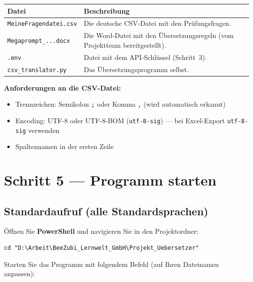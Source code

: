 \documentclass[a4paper,11pt]{article}
\newenvironment{hinweisbox}{%
  \begin{mdframed}[backgroundcolor=hinweis,linecolor=hinweisrand,linewidth=1pt,
    innerleftmargin=8pt,innerrightmargin=8pt,innertopmargin=6pt,innerbottommargin=6pt]
  \small}{%
  \end{mdframed}}
\begin{document}
\begin{center}
\begin{tabularx}{0.92\textwidth}{@{}l X@{}}
\toprule
\textbf{Datei} & \textbf{Beschreibung} \\
\midrule
\texttt{MeineFragendatei.csv} & Die deutsche CSV-Datei mit den Prüfungsfragen. \\[3pt]
\texttt{Megaprompt\_...docx} & Die Word-Datei mit den Übersetzungsregeln
                               (vom Projektteam bereitgestellt). \\[3pt]
\texttt{.env} & Datei mit dem API-Schlüssel (Schritt~3). \\[3pt]
\texttt{csv\_translator.py} & Das Übersetzungsprogramm selbst. \\
\bottomrule
\end{tabularx}
\end{center}

\begin{hinweisbox}
\textbf{Anforderungen an die CSV-Datei:}
\begin{itemize}[itemsep=2pt]
  \item Trennzeichen: Semikolon \texttt{;} oder Komma \texttt{,}
        (wird automatisch erkannt)
  \item Encoding: UTF-8 oder UTF-8-BOM (\texttt{utf-8-sig}) — bei Excel-Export
        \texttt{utf-8-sig} verwenden
  \item Spaltennamen in der ersten Zeile
\end{itemize}
\end{hinweisbox}

\section{Schritt 5 — Programm starten}

\subsection{Standardaufruf (alle Standardsprachen)}

Öffnen Sie \textbf{PowerShell} und navigieren Sie in den Projektordner:

\begin{lstlisting}
cd "D:\Arbeit\BeeZubi_Lernwelt_GmbH\Projekt_Uebersetzer"
\end{lstlisting}

Starten Sie das Programm mit folgendem Befehl (auf Ihren Dateinamen anpassen):
\end{document}
